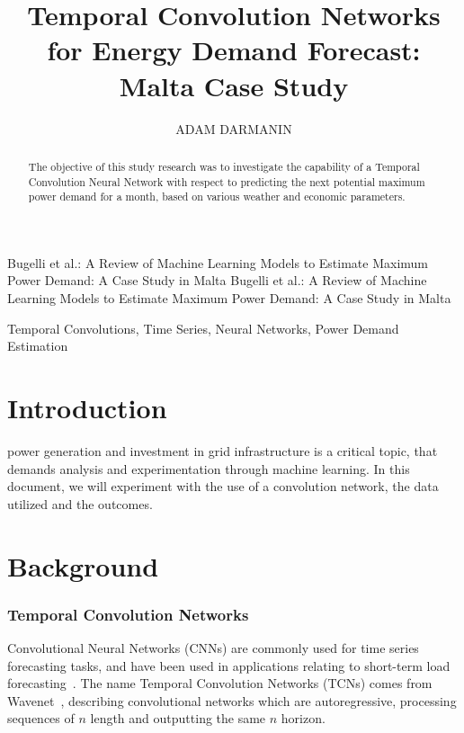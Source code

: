 \documentclass{ieeeaccess}
\begin{document}

\title{Temporal Convolution Networks for Energy Demand Forecast: Malta Case Study}
\author{\uppercase{Adam Darmanin}}
\address[1]{Department of Artificial Intelligence, University of Malta (email: adam.darmanin.03@um.edu.mt)}



\markboth
{Bugelli et al.: A Review of Machine Learning Models to Estimate Maximum Power Demand: A Case Study in Malta}
{Bugelli et al.: A Review of Machine Learning Models to Estimate Maximum Power Demand: A Case Study in Malta}



\begin{abstract}
The objective of this study research was to investigate the capability of a Temporal Convolution Neural Network with respect to predicting the next potential maximum power demand for a month, based on various weather and economic parameters.
\end{abstract}

\begin{keywords}
Temporal Convolutions, Time Series, Neural Networks, Power Demand Estimation
\end{keywords}

\titlepgskip=-21pt

\maketitle

\section{Introduction}
\label{sec:introduction}

 power generation and investment in grid infrastructure is a critical topic, that demands analysis and experimentation through machine learning. In this document, we will experiment with the use of a convolution network, the data utilized and the outcomes.

\section{Background}
\label{sec:background}

\subsubsection{Temporal Convolution Networks}
Convolutional Neural Networks (CNNs) are commonly used for time series forecasting tasks, and have been used in applications relating to short-term load forecasting~\cite{Gasparin2022,Benitez2020}. The name Temporal Convolution Networks (TCNs) comes from Wavenet~\cite{Gasparin2022}, describing convolutional networks which are autoregressive, processing sequences of $n$ length and outputting the same $n$ horizon.
\end{document}
